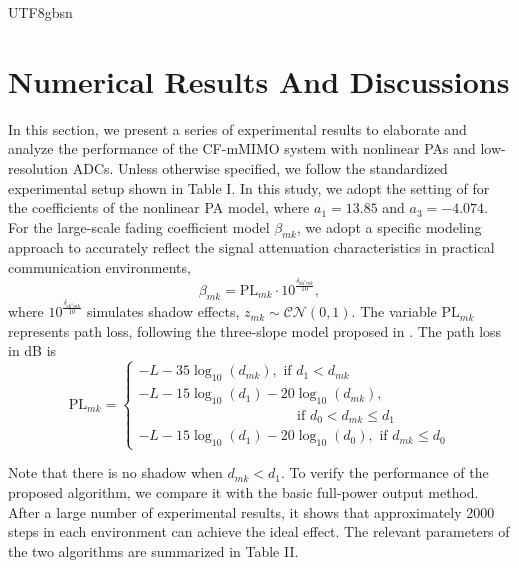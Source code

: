 \documentclass[lettersize,journal]{IEEEtran}
\begin{document}
\begin{CJK}{UTF8}{gbsn}
\section{Numerical Results And Discussions}
In this section, we present a series of experimental results to elaborate and analyze the performance of the CF-mMIMO system with nonlinear PAs and low-resolution ADCs. Unless otherwise specified, we follow the standardized experimental setup shown in Table I. In this study, we adopt the setting of \cite{paper15} for the coefficients of the nonlinear PA model, where $a_1=13.85$ and $a_3 =-4.074$. For the large-scale fading coefficient model $\beta _{mk}$, we adopt a specific modeling approach to accurately reflect the signal attenuation characteristics in practical communication environments,
\begin{equation}\beta _{mk} = \text{PL}_{mk}\cdot 10^{\frac{\delta _{\text{sh}^zmk}}{10} },\end{equation}
where $10^{\frac{\delta _{\text{sh}^zmk}}{10} }$ simulates shadow effects, $z_{mk}\sim \mathcal{CN }(0,1) $. The variable $\text{PL}_{mk}$ represents path loss, following the three-slope model proposed in \cite{paperI4}. The path loss in dB is
\begin{equation}\text{PL}_{m k}=\left\{\begin{array}{l}
-L-35 \log _{10}\left(d_{m k}\right), \text { if } d_1<d_{mk} \\
-L-15 \log _{10}\left(d_{1}\right)-20 \log _{10}\left(d_{m k}\right), \\
\quad\quad\quad\quad\quad\quad\quad\quad\quad\quad\quad\text { if } d_{0}<d_{m k} \leq d_{1} \\
-L-15 \log _{10}\left(d_{1}\right)-20 \log _{10}\left(d_{0}\right), \text { if } d_{m k} \leq d_{0}
\end{array}\right.\end{equation}

Note that there is no shadow when $d_{mk}<d_{1}$. 
To verify the performance of the proposed algorithm, we compare it with the basic full-power output method. After a large number of experimental results, it shows that approximately 2000 steps in each environment can achieve the ideal effect. The relevant parameters of the two algorithms are summarized in Table II.


\end{CJK}
\end{document}
